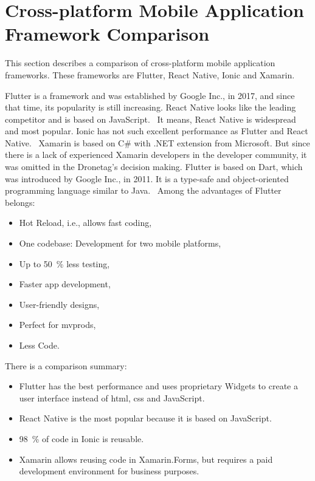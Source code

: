 \section{Cross-platform Mobile Application Framework Comparison}\label{sec:cross-platform-mobile-application-framework-comparison}
This section describes a comparison of cross-platform mobile application frameworks.
These frameworks are Flutter, React Native, Ionic and Xamarin.

Flutter is a framework and was established by Google Inc., in 2017, and since that time, its popularity is still increasing.
React Native looks like the leading competitor and is based on JavaScript.~\cite{flutterVsReactNativeNevercodeIo}
It means, React Native is widespread and most popular.
Ionic has not such excellent performance as Flutter and React Native.~\cite{crossPlatformFrameworokComparation}
Xamarin is based on C\# with .NET extension from Microsoft.
But since there is a lack of experienced Xamarin developers in the developer community, it was omitted in the Dronetag's decision making.
Flutter is based on Dart, which was introduced by Google Inc., in 2011.
It is a type-safe and object-oriented programming language similar to Java.~\cite{dartTypeSystem}
\newline
\newline
Among the advantages of Flutter~\cite{flutterVsReactNativeHackrIo} belongs:
\begin{itemize}
    \item Hot Reload, i.e., allows fast coding,
    \item One codebase: Development for two mobile platforms,
    \item Up to 50~\% less testing,
    \item Faster app development,
    \item User-friendly designs,
    \item Perfect for \acrshort{mvprod}s,
    \item Less Code.
\end{itemize}
There is a comparison summary:
\begin{itemize}
    \item Flutter has the best performance and uses proprietary Widgets to create a user interface instead of \acrshort{html}, \acrshort{css} and JavaScript.
    \item React Native is the most popular because it is based on JavaScript.
    \item 98~\% of code in Ionic is reusable.
    \item Xamarin allows reusing code in Xamarin.Forms, but requires a paid development environment for business purposes.
\end{itemize}